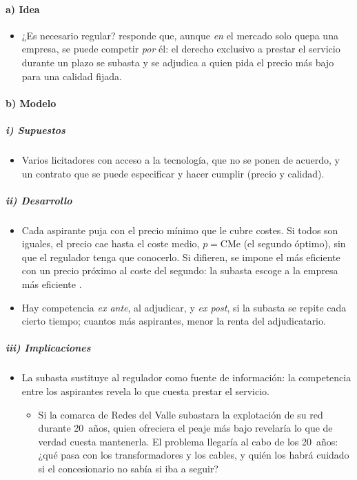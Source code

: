 \documentclass[11pt]{article}
\begin{document}
\paragraph{a) Idea}

\begin{itemize}
\item ¿Es necesario regular? \textcite{Demsetz1968Why} responde que, aunque \emph{en} el mercado solo quepa una empresa, se puede competir \emph{por} él: el derecho exclusivo a prestar el servicio durante un plazo se subasta y se adjudica a quien pida el precio más bajo para una calidad fijada.
\end{itemize}

\paragraph{b) Modelo}

\subparagraph{i) Supuestos}

\begin{itemize}
\item Varios licitadores con acceso a la tecnología, que no se ponen de acuerdo, y un contrato que se puede especificar y hacer cumplir (precio y calidad).
\end{itemize}

\subparagraph{ii) Desarrollo}

\begin{itemize}
\item Cada aspirante puja con el precio mínimo que le cubre costes. Si todos son iguales, el precio cae hasta el coste medio, $p=\mathrm{CMe}$ (el segundo óptimo), sin que el regulador tenga que conocerlo. Si difieren, se impone el más eficiente con un precio próximo al coste del segundo: la subasta escoge a la empresa más eficiente .
\item Hay competencia \emph{ex ante}, al adjudicar, y \emph{ex post}, si la subasta se repite cada cierto tiempo; cuantos más aspirantes, menor la renta del adjudicatario\nocite{ArmstrongSappington2007Recent}.
\end{itemize}

\subparagraph{iii) Implicaciones}

\begin{itemize}
\item La subasta sustituye al regulador como fuente de información: la competencia entre los aspirantes revela lo que cuesta prestar el servicio.
  \begin{itemize}
  \item Si la comarca de Redes del Valle subastara la explotación de su red durante 20~años, quien ofreciera el peaje más bajo revelaría lo que de verdad cuesta mantenerla. El problema llegaría al cabo de los 20~años: ¿qué pasa con los transformadores y los cables, y quién los habrá cuidado si el concesionario no sabía si iba a seguir?
  \end{itemize}
\end{itemize}
\end{document}
